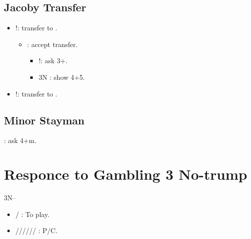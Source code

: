 \documentclass[12pt,twoside,a5paper]{report}%
\begin{document}
	\section*{Jacoby Transfer}
	\begin{itemize}
		\renewcommand{\labelitemi}{}
		\item {}!: transfer to .
		\begin{itemize}
		\renewcommand{\labelitemi}{--}
			\item {} : accept transfer.
			\begin{itemize}
			\renewcommand{\labelitemi}{--}	
				\item {}!: ask 3+\he{}.
				\item 3N : show 4\sp{}+5\he{}.
			\end{itemize}
		\end{itemize}
		\item {}!: transfer to .
	\end{itemize}

	\section*{Minor Stayman}
	 : ask 4+m.

\chapter*{Responce to Gambling 3 No-trump}
	3N--\\
	\begin{itemize}
	\renewcommand{\labelitemi}{}
	\item {}/ : To play.
	\item {}////// : P/C.
	\end{itemize}

\end{document}
